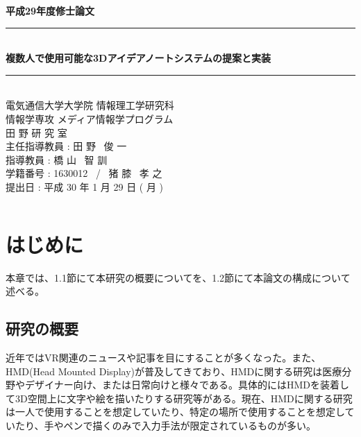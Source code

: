 \documentclass[11pt,a4j, titlepage]{jarticle} %
\begin{document}
\begin{titlepage}
	\begin{center}
		\vspace{8ex}
		{\Large \bf 平成29年度修士論文}
		\vspace{3ex}\\
		\rule{\hsize}{2mm}
		\vspace{1mm}\\ 
		{\LARGE \bf 複数人で使用可能な3Dアイデアノートシステムの提案と実装} 
		\vspace{6mm}\\ 
		\rule{\hsize}{2mm} 
		\vspace{2.5cm} \\ 
		{\Large 電気通信大学大学院 情報理工学研究科 \\ 
		情報学専攻 メディア情報学プログラム} 
		\vspace{2ex} \\ 
		\renewcommand{\thefootnote}{\fnsymbol{footnote}} 
		{\Large 田 野 研 究 室} 
		\vspace{3ex} \\ 
		{\Large 主任指導教員 : 田 野 \ 俊 一} 
		\vspace{3ex} \\
                {\Large 指導教員 : 橋 山 \ 智 訓} 
		\vspace{3ex} \\
		{\Large 学籍番号 : 1630012 \ / \ 猪 膝 \ 孝 之} 
		\vspace{5ex} \\ 
		{\Large 提出日 : 平成 30 年 1 月 29 日 ( 月 )} 
		\vspace{-5ex} \\ 
		\begin{verbatim} 
		\end{verbatim} 
	\end{center} 
\end{titlepage}

\tableofcontents
\newpage
\listoffigures
\newpage
\listoftables
\newpage
\section{はじめに}
本章では、1.1節にて本研究の概要についてを、1.2節にて本論文の構成について述べる。

\subsection{研究の概要}
近年ではVR関連のニュースや記事を目にすることが多くなった。また、HMD(Head Mounted Display)が普及してきており、HMDに関する研究は医療分野やデザイナー向け、または日常向けと様々である。具体的にはHMDを装着して3D空間上に文字や絵を描いたりする研究等がある。現在、HMDに関する研究は一人で使用することを想定していたり、特定の場所で使用することを想定していたり、手やペンで描くのみで入力手法が限定されているものが多い。
\end{document}
